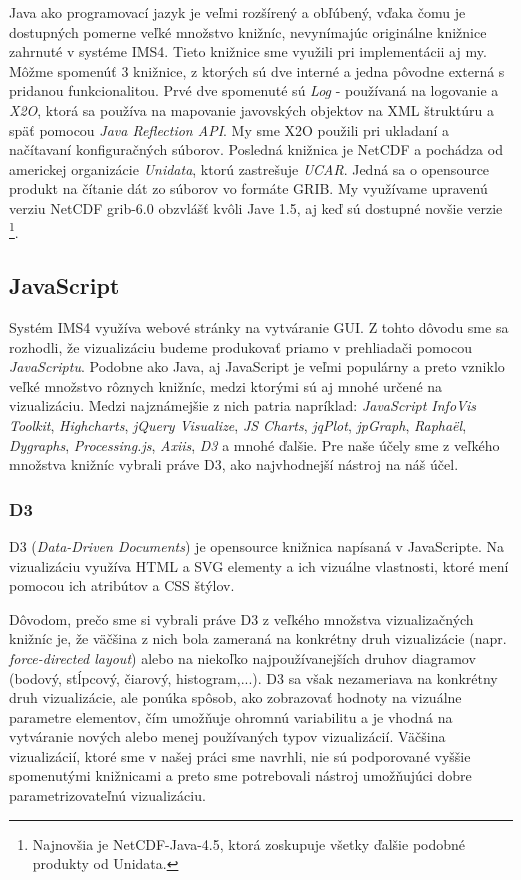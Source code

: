 Java ako programovací jazyk je veľmi rozšírený a obľúbený, vďaka čomu je dostupných pomerne veľké množstvo knižníc, nevynímajúc originálne knižnice zahrnuté v systéme IMS4. Tieto knižnice sme využili pri implementácii aj my. Môžme spomenúť 3 knižnice, z ktorých sú dve interné a jedna pôvodne externá s pridanou funkcionalitou. Prvé dve spomenuté sú \textit{Log} - používaná na logovanie a \textit{X2O}, ktorá sa používa na mapovanie javovských objektov na XML štruktúru a späť pomocou \textit{Java Reflection API}. My sme X2O použili pri ukladaní a načítavaní konfiguračných súborov. Posledná knižnica je NetCDF a pochádza od americkej organizácie \textit{Unidata}, ktorú zastrešuje \textit{UCAR}. Jedná sa o opensource produkt na čítanie dát zo súborov vo formáte GRIB. My využívame upravenú verziu NetCDF grib-6.0 obzvlášť kvôli Jave 1.5, aj keď sú dostupné novšie verzie \footnote{Najnovšia je NetCDF-Java-4.5, ktorá zoskupuje všetky ďalšie podobné produkty od Unidata.}.

\subsection{JavaScript}
Systém IMS4 využíva webové stránky na vytváranie GUI. Z tohto dôvodu sme sa rozhodli, že vizualizáciu budeme produkovať priamo v prehliadači pomocou \textit{JavaScriptu}. Podobne ako Java, aj JavaScript je veľmi populárny a preto vzniklo veľké množstvo rôznych knižníc, medzi ktorými sú aj mnohé určené na vizualizáciu. Medzi najznámejšie z nich patria napríklad: \textit{JavaScript InfoVis Toolkit}, \textit{Highcharts}, \textit{jQuery Visualize}, \textit{JS Charts}, \textit{jqPlot}, \textit{jpGraph}, \textit{Raphaël}, \textit{Dygraphs},\textit{ Processing.js}, \textit{Axiis}, \textit{D3} a mnohé ďalšie. Pre naše účely sme z veľkého množstva knižníc vybrali práve D3, ako najvhodnejší nástroj na náš účel.

\subsubsection{D3}
D3 (\textit{Data-Driven Documents}) \cite{XYZ}  je opensource knižnica napísaná v JavaScripte. Na vizualizáciu využíva HTML a SVG elementy a ich vizuálne vlastnosti, ktoré mení pomocou ich atribútov a CSS štýlov. 

Dôvodom, prečo sme si vybrali práve D3 z veľkého množstva vizualizačných knižníc je, že väčšina z nich bola zameraná na konkrétny druh vizualizácie (napr. \textit{force-directed layout}) alebo na niekoľko najpoužívanejších druhov diagramov (bodový, stĺpcový, čiarový, histogram,...). D3 sa však nezameriava na konkrétny druh vizualizácie, ale ponúka spôsob, ako zobrazovať hodnoty na vizuálne parametre elementov, čím umožňuje ohromnú variabilitu a je vhodná na vytváranie nových alebo menej používaných typov vizualizácií. Väčšina vizualizácií, ktoré sme v našej práci sme navrhli, nie sú podporované vyššie spomenutými knižnicami a preto sme potrebovali nástroj umožňujúci dobre parametrizovateľnú vizualizáciu.

